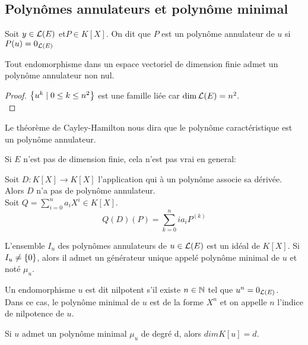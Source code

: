 \subsection{Polynômes annulateurs et polynôme minimal}


\begin{definition}
	Soit $y \in \mathcal{L}(E)$ et$P \in K[X]$. On dit que $P$ est un polynôme annulateur de $u$ si $P(u) = 0_{\mathcal{L}(E)}$
\end{definition}


\begin{prop}
	Tout endomorphisme dans un espace vectoriel de dimension finie admet un polynôme annulateur non nul.
\end{prop}


\begin{proof}
	$\left\{u^k \mid 0 \leq k \leq n^2\right\}$ est une famille liée car $\dim \mathcal{L}(E) = n^2$.\\
\end{proof}


\begin{remarque}
	Le théorème de Cayley-Hamilton nous dira que le polynôme caractéristique est un polynôme annulateur.
\end{remarque}

\begin{remarque}
	Si $E$ n'est pas de dimension finie, cela n'est pas vrai en general:

	Soit $ D : K[X] \to K[X]$ l'application qui à un polynôme associe sa dérivée. Alors $D$ n'a pas de polynôme annulateur.\\
	Soit $Q = \sum\limits_{i=0}^n a_iX^i \in K[X]$.
	$$Q(D)(P) = \sum\limits_{k=0}^n ia_i P^{(k)}$$
\end{remarque}



\begin{prop}
	L'ensemble $I_u$ des polynômes annulateurs de $u \in \mathcal{L}(E)$ est un idéal de $K[X]$.
	Si $I_u \neq \left\{0\right\}$, alors il admet un générateur unique appelé polynôme minimal de $u$ et noté $\mu_u$.
\end{prop}


\begin{definition}
	Un endomorphisme $u$ est dit nilpotent s'il existe $n \in \mathbb{N}$ tel que $u^n = 0_{\mathcal{L}(E)}$.\\
	Dans ce cas, le polynôme minimal de $u$ est de la forme $X^n$ et on appelle $n$ l'indice de nilpotence de $u$.
\end{definition}


\begin{remarque}
    Si $u$ admet un polynôme minimal $\mu_u$ de degré d, alors $dim K[u] = d$.
\end{remarque}

